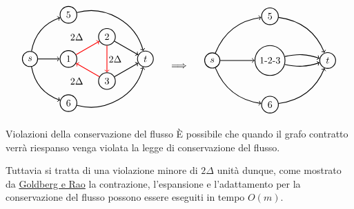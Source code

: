 \documentclass[a4paper, 11pt]{report}
\begin{document}
\[\begin{tabular}{ccc}
    \begin{tikzpicture}[node distance={18mm}, thick , main/.style = {draw, circle}] 
    
    \node[main] (0) {$s$};
    \node[main] (1) at (1*1.4,0) {1};
    \node[main] (2) at (2*1.4,0.577*1.4) {2};
    \node[main] (3) at (2*1.4,-0.577*1.4) {3};
    \node[main] (4) at (3*1.4,0) {$t$};
    \node[main] (5) at (1*1.4,1.154*1.4) {$5$};
    \node[main] (6) at (1*1.4,-1.154*1.4) {$6$};

    \draw[->] (0) [bend left] to (5);
    \draw[->] (0) [bend right] to (6);
    \draw[->] (0)  to (1);
    \draw[->] (1)[red]  to (2);
    \draw[->] (2)[red]  to (3);
    \draw[->] (3)[red]  to (1);
    \draw[->] (2)  to (4);
    \draw[->] (3)  to (4);
    \draw[->] (5) [bend left = 45] to (4);
    \draw[->] (6) [bend right = 45] to (4);

    \node at (3.1,0) {$2\Delta$};
    \node at (1.7,0.577*1.4) {$2\Delta$};
    \node at (1.7,-0.577*1.4) {$2\Delta$};
    

\end{tikzpicture}&\begin{tikzpicture}
    \node {$\implies$};%
    \node at (0,1.4) {};
    \node at (0,-1.6) {};
\end{tikzpicture}  &
\begin{tikzpicture}[node distance={19mm}, thick , main/.style = {draw, circle}] 
    \node[main] (0) {$s$};
    \node[main] (1) at (1.5*1.4,0) {1-2-3};
    \node[main] (5) at (1.5*1.4,1.154*1.4) {$5$};
    \node[main] (6) at (1.5*1.4,-1.154*1.4) {$6$};
    \node[main] (4) at (3*1.4,0) {$t$};

    \draw[->] (0) [bend left] to (5);
    \draw[->] (5) [bend left] to (4);
    \draw[->] (0) [bend right] to (6);
    \draw[->] (6) [bend right] to (4);

    \draw[->] (0) to (1);
    \draw[->] (1) [bend left= 15] to (4);
    \draw[->] (1) [bend right = 15] to (4);

\end{tikzpicture}
\end{tabular}\]
\begin{obs}{Violazioni della conservazione del flusso}{}
    È possibile che quando il grafo contratto verrà riespanso venga violata la legge di conservazione del flusso. 
    
    Tuttavia si tratta di una violazione minore di $2\Delta$ unità dunque, come mostrato da \hyperref[fixCont]{Goldberg e Rao} la contrazione, l'espansione e l'adattamento per la conservazione del flusso possono essere eseguiti in tempo $O(m)$. 
\end{obs}
\end{document}
